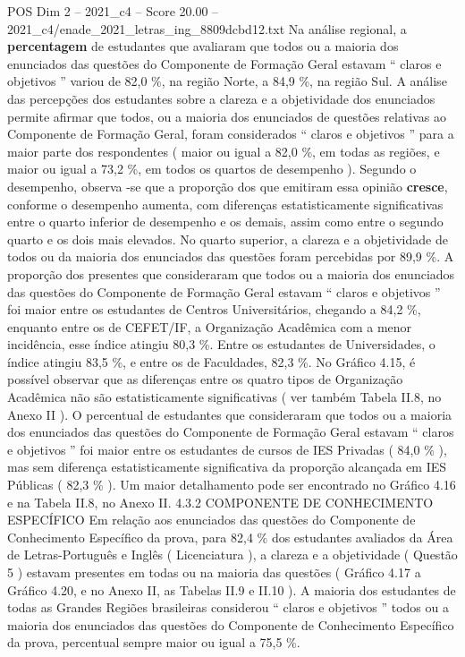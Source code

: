 \begin{textsample}{POS Dim 2 – 2021\_c4 – Score 20.00 – 2021\_c4/enade\_2021\_letras\_ing\_8809dcbd12.txt}
Na análise regional, a \textbf{percentagem} de estudantes que avaliaram que todos ou a maioria dos enunciados das questões do Componente de Formação Geral estavam “ claros e objetivos ” variou de 82,0 \%, na região Norte, a 84,9 \%, na região Sul.
A análise das percepções dos estudantes sobre a clareza e a objetividade dos enunciados permite afirmar que todos, ou a maioria dos enunciados de questões relativas ao Componente de Formação Geral, foram considerados “ claros e objetivos ” para a maior parte dos respondentes ( maior ou igual a 82,0 \%, em todas as regiões, e maior ou igual a 73,2 \%, em todos os quartos de desempenho ).
Segundo o desempenho, observa -se que a proporção dos que emitiram essa opinião \textbf{cresce}, conforme o desempenho aumenta, com diferenças estatisticamente significativas entre o quarto inferior de desempenho e os demais, assim como entre o segundo quarto e os dois mais elevados.
No quarto superior, a clareza e a objetividade de todos ou da maioria dos enunciados das questões foram percebidas por 89,9 \%.
A proporção dos presentes que consideraram que todos ou a maioria dos enunciados das questões do Componente de Formação Geral estavam “ claros e objetivos ” foi maior entre os estudantes de Centros Universitários, chegando a 84,2 \%, enquanto entre os de CEFET/IF, a Organização Acadêmica com a menor incidência, esse índice atingiu 80,3 \%.
Entre os estudantes de Universidades, o índice atingiu 83,5 \%, e entre os de Faculdades, 82,3 \%.
No Gráfico 4.15, é possível observar que as diferenças entre os quatro tipos de Organização Acadêmica não são estatisticamente significativas ( ver também Tabela II.8, no Anexo II ).
O percentual de estudantes que consideraram que todos ou a maioria dos enunciados das questões do Componente de Formação Geral estavam “ claros e objetivos ” foi maior entre os estudantes de cursos de IES Privadas ( 84,0 \% ), mas sem diferença estatisticamente significativa da proporção alcançada em IES Públicas ( 82,3 \% ).
Um maior detalhamento pode ser encontrado no Gráfico 4.16 e na Tabela II.8, no Anexo II. 4.3.2 COMPONENTE DE CONHECIMENTO ESPECÍFICO Em relação aos enunciados das questões do Componente de Conhecimento Específico da prova, para 82,4 \% dos estudantes avaliados da Área de Letras-Português e Inglês ( Licenciatura ), a clareza e a objetividade ( Questão 5 ) estavam presentes em todas ou na maioria das questões ( Gráfico 4.17 a Gráfico 4.20, e no Anexo II, as Tabelas II.9 e II.10 ).
A maioria dos estudantes de todas as Grandes Regiões brasileiras considerou “ claros e objetivos ” todos ou a maioria dos enunciados das questões do Componente de Conhecimento Específico da prova, percentual sempre maior ou igual a 75,5 \%.

\end{textsample}
